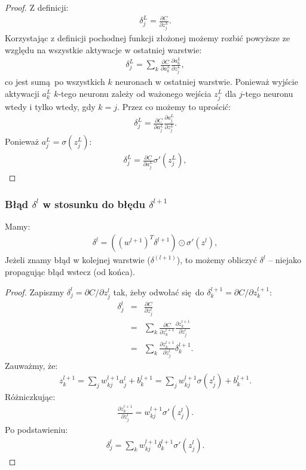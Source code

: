 \documentclass[10pt, oneside]{article}
\theoremstyle{remark}
\begin{document}
\begin{proof}
Z definicji:
\begin{eqnarray}
  \delta^L_j = \frac{\partial C}{\partial z^L_j}.
\end{eqnarray}
Korzystając z definicji pochodnej funkcji złożonej możemy rozbić powyższe ze względu na wszystkie aktywacje w ostatniej warstwie:
\begin{eqnarray}
  \delta^L_j = \sum_k \frac{\partial C}{\partial a^L_k} \frac{\partial a^L_k}{\partial z^L_j},
\end{eqnarray}
co jest sumą po wszystkich $k$ neuronach w ostatniej warstwie.
Ponieważ wyjście aktywacji $a^L_k$ $k$-tego neuronu zależy od ważonego wejścia $z^L_j$ dla $j$-tego neuronu wtedy i tylko wtedy, gdy $k=j$.
Przez co możemy to uprościć:
\begin{eqnarray}
  \delta^L_j = \frac{\partial C}{\partial a^L_j} \frac{\partial a^L_j}{\partial z^L_j}.
\end{eqnarray}
Ponieważ $a^L_j = \sigma(z^L_j)$:
\begin{eqnarray}
  \delta^L_j = \frac{\partial C}{\partial a^L_j} \sigma'(z^L_j),
\end{eqnarray}
\end{proof}

\subsubsection{Błąd $\delta^l$ w stosunku do błędu $\delta^{l+1}$}
Mamy:
\begin{eqnarray} 
  \delta^l = ((w^{l+1})^T \delta^{l+1}) \odot \sigma'(z^l),
\end{eqnarray}
Jeżeli znamy błąd w kolejnej warstwie ($\delta^(l+1)$), to możemy obliczyć $\delta^l$ -- niejako propagując błąd wstecz (od końca).

\begin{proof}
Zapiszmy $\delta^l_j = \partial C / \partial z^l_j$ tak, żeby odwołać się do $\delta^{l+1}_k = \partial C / \partial z^{l+1}_k$:
\begin{eqnarray}
  \delta^l_j & = & \frac{\partial C}{\partial z^l_j} \\
  & = & \sum_k \frac{\partial C}{\partial z^{l+1}_k} \frac{\partial z^{l+1}_k}{\partial z^l_j} \\ 
  & = & \sum_k \frac{\partial z^{l+1}_k}{\partial z^l_j} \delta^{l+1}_k.
\end{eqnarray}
Zauważmy, że:
\begin{eqnarray}
  z^{l+1}_k = \sum_j w^{l+1}_{kj} a^l_j +b^{l+1}_k = \sum_j w^{l+1}_{kj} \sigma(z^l_j) +b^{l+1}_k.
\end{eqnarray}
Różniczkując:
\begin{eqnarray}
  \frac{\partial z^{l+1}_k}{\partial z^l_j} = w^{l+1}_{kj} \sigma'(z^l_j).
\end{eqnarray}
Po podstawieniu:
\begin{eqnarray}
  \delta^l_j = \sum_k w^{l+1}_{kj}  \delta^{l+1}_k \sigma'(z^l_j).
\end{eqnarray}
\end{proof}
\end{document}
